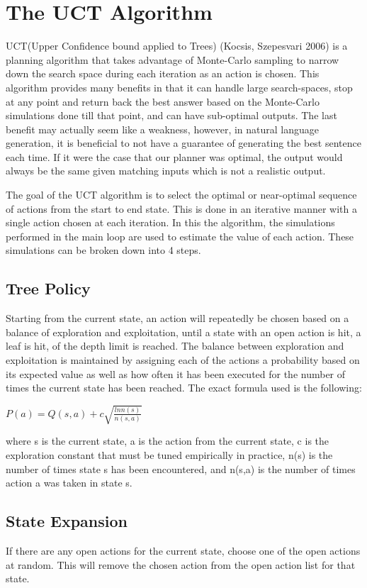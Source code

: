 \section{The UCT Algorithm}

UCT(Upper Confidence bound applied to Trees) (Kocsis, Szepesvari 2006) is a planning algorithm that takes
advantage of Monte-Carlo sampling to narrow down the search space during each iteration as an action is chosen.
This algorithm provides many benefits in that it can handle large search-spaces, stop at any point and return back
the best answer based on the Monte-Carlo simulations done till that point, and can have sub-optimal outputs.  The
last benefit may actually seem like a weakness, however, in natural language generation, it is beneficial to not have
a guarantee of generating the best sentence each time.  If it were the case that our planner was optimal, the output
would always be the same given matching inputs which is not a realistic output.

The goal of the UCT algorithm is to select the optimal or near-optimal sequence of actions from the start to end state.
This is done in an iterative manner with a single action chosen at each iteration.  In this the algorithm, the simulations
performed in the main loop are used to estimate the value of each action.  These simulations can be broken down into
4 steps.

\subsection{Tree Policy}
Starting from the current state, an action will repeatedly be chosen based on a balance of exploration and exploitation,
until a state with an open action is hit, a leaf is hit, of the depth limit is reached.  The balance between exploration and
exploitation is maintained by assigning each of the actions a probability based on its expected value as well as how often
it has been executed for the number of times the current state has been reached.  The exact formula used is the following:

$P(a) = Q(s,a) + c\sqrt{\frac{ln n(s)}{n(s,a)}}$

where s is the current state, a is the action from the current state, c is the exploration constant that must be tuned
empirically in practice, n(s) is the number of times state s has been encountered, and n(s,a) is the number of times action
a was taken in state s.

\subsection{State Expansion}
If there are any open actions for the current state, choose one of the open actions at random.  This will remove the
chosen action from the open action list for that state.

